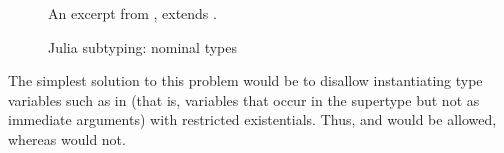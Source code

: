 \begin{figure}[t!]
\footnotesize
{}
\caption{Julia subtyping: nominal types}\label{fig:jlsubex-inheritance}
\begin{tablenotes}[para]
\small
\centering
An excerpt from \cite{bib:zappa-nardelli:julia-sub:oopsla:2018}, extends
.
\end{tablenotes}
\end{figure}

The simplest solution to this problem would be to disallow instantiating
type variables such as \vx in  (that is, variables that
occur in the supertype but not as immediate arguments)
with restricted existentials.
Thus, \tyinv{\tyname{ZooVec}}\tyint and
 would be allowed,
whereas  would not.

